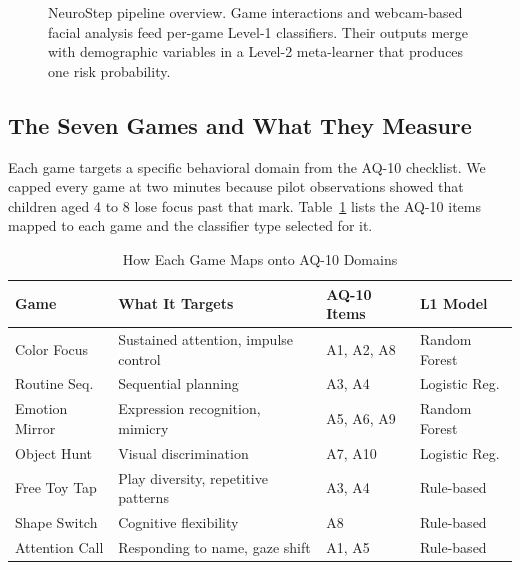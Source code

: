 \documentclass[conference]{IEEEtran}
\begin{document}
\begin{figure}[htbp]
{%
}
\caption{NeuroStep pipeline overview. Game interactions and webcam-based facial analysis feed per-game Level-1 classifiers. Their outputs merge with demographic variables in a Level-2 meta-learner that produces one risk probability.}
\label{fig:architecture}
\end{figure}

\subsection{The Seven Games and What They Measure}
Each game targets a specific behavioral domain from the AQ-10 checklist. We capped every game at two minutes because pilot observations showed that children aged 4 to 8 lose focus past that mark. Table~\ref{tab:games} lists the AQ-10 items mapped to each game and the classifier type selected for it.

\begin{table}[htbp]
\caption{How Each Game Maps onto AQ-10 Domains}
\label{tab:games}
\centering
\renewcommand{\arraystretch}{1.15}
\begin{tabular}{@{}p{1.8cm}p{2.2cm}p{1.2cm}p{1.5cm}@{}}
\toprule
\textbf{Game} & \textbf{What It Targets} & \textbf{AQ-10 Items} & \textbf{L1 Model} \\
\midrule
Color Focus & Sustained attention, impulse control & A1, A2, A8 & Random Forest \\
Routine Seq. & Sequential planning & A3, A4 & Logistic Reg. \\
Emotion Mirror & Expression recognition, mimicry & A5, A6, A9 & Random Forest \\
Object Hunt & Visual discrimination & A7, A10 & Logistic Reg. \\
Free Toy Tap & Play diversity, repetitive patterns & A3, A4 & Rule-based \\
Shape Switch & Cognitive flexibility & A8 & Rule-based \\
Attention Call & Responding to name, gaze shift & A1, A5 & Rule-based \\
\bottomrule
\end{tabular}
\end{table}
\end{document}
